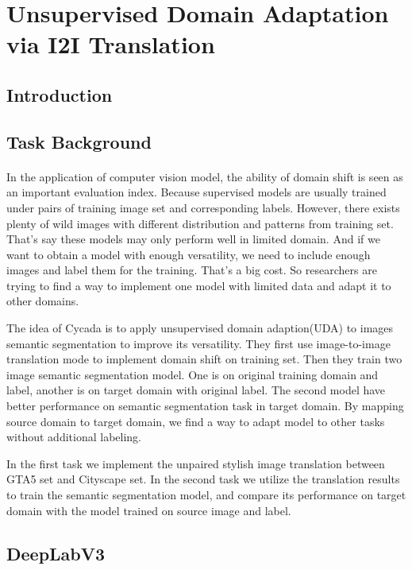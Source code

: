 \section{Unsupervised Domain Adaptation via I2I Translation}
\subsection{Introduction}
\subsection{Task Background}
\paragraph{}
In the application of computer vision model, the ability of domain shift is seen as an important evaluation index. Because supervised models are usually trained under pairs of training image set and corresponding labels. However, there exists plenty of wild images with different distribution and patterns from training set. That's say these models may only perform well in limited domain. And if we want to obtain a model with enough versatility, we need to include enough images and label them for the training. That's a big cost. So researchers are trying to find a way to implement one model with limited data and adapt it to other domains.

The idea of Cycada\cite{cycada} is to apply unsupervised domain adaption(UDA) to images semantic segmentation to improve its versatility. They first use image-to-image translation mode to implement domain shift on training set. Then they train two image semantic segmentation model. One is on original training domain and label, another is on target domain with original label. The second model have better performance on semantic segmentation task in target domain. By mapping source domain to target domain, we find a way to adapt model to other tasks without additional labeling.

In the first task we implement the unpaired stylish image translation between GTA5 set and Cityscape set. In the second task we utilize the translation results to train the semantic segmentation model, and compare its performance on target domain with the model trained on source image and label. 

\subsection{DeepLabV3}
